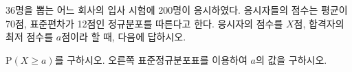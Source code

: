 \noindent\begin{minipage}[t]{0.58\linewidth}\vspace{0pt}\raggedright 36명을 뽑는 어느 회사의 입사 시험에 200명이 응시하였다. 응시자들의 점수는 평균이 70점, 표준편차가 12점인 정규분포를 따른다고 한다. 응시자의 점수를 $X$점, 합격자의 최저 점수를 $a$점이라 할 때, 다음에 답하시오.\end{minipage}\hfill\begin{minipage}[t]{0.4\linewidth}\vspace{0pt}\centering \resizebox{\ifdim\width>\linewidth\linewidth\else\width\fi}{!}{}\end{minipage}\par
{} $\mathrm{P}(X\ge a)$를 구하시오.
 오른쪽 표준정규분포표를 이용하여 $a$의 값을 구하시오.
